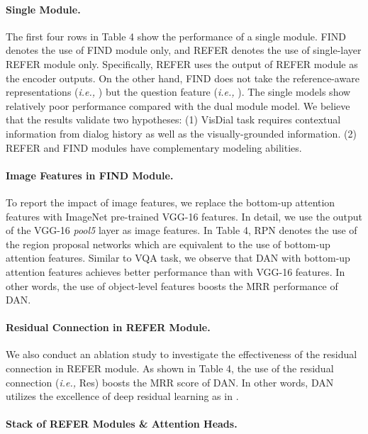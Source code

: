 \documentclass[11pt,a4paper]{article}
\begin{document}
\paragraph{Single Module.}
The first four rows in Table 4 show the performance of a single module. FIND denotes the use of FIND module only, and REFER denotes the use of single-layer REFER module only. Specifically, REFER uses the output of REFER module as the encoder outputs. On the other hand, FIND does not take the reference-aware representations ({\it i.e.,} ) but the question feature ({\it i.e.,} ). The single models show relatively poor performance compared with the dual module model. We believe that the results validate two hypotheses: (1) VisDial task requires contextual information from dialog history as well as the visually-grounded information. (2) REFER and FIND modules have complementary modeling abilities. 
\paragraph{Image Features in FIND Module.} To report the impact of image features, we replace the bottom-up attention features \cite{Anderson2017up-down} with ImageNet pre-trained VGG-16 \cite{simonyan2014very} features. In detail, we use the output of the VGG-16 {\it pool5} layer as image features. In Table 4, RPN denotes the use of the region proposal networks \cite{ren2015faster} which are equivalent to the use of bottom-up attention features. Similar to VQA task, we observe that DAN with bottom-up attention features achieves better performance than with VGG-16 features. In other words, the use of object-level features boosts the MRR performance of DAN.
\paragraph{Residual Connection in REFER Module.}
We also conduct an ablation study to investigate the effectiveness of the residual connection in REFER module. As shown in Table 4, the use of the residual connection ({\it i.e.,} Res) boosts the MRR score of DAN. In other words, DAN utilizes the excellence of deep residual learning as in \cite{he2016deep, rocktaschel2015reasoning, yang2016stacked, kim2016multimodal,  vaswani2017attention}.  
\paragraph{Stack of REFER Modules \& Attention Heads.} 
\end{document}
